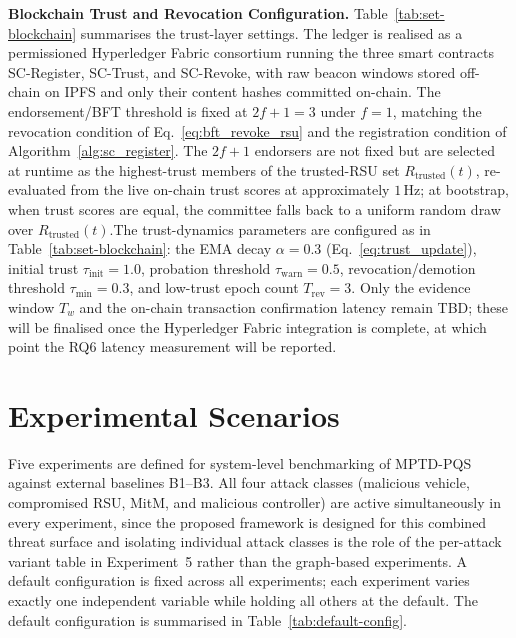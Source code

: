 \documentclass[12pt, a4paper]{report}
\begin{document}
\textbf{Blockchain Trust and Revocation Configuration.}
Table~\ref{tab:set-blockchain} summarises the trust-layer settings. The
ledger is realised as a permissioned Hyperledger Fabric consortium running
the three smart contracts SC-Register, SC-Trust, and SC-Revoke, with raw
beacon windows stored off-chain on IPFS and only their content hashes
committed on-chain. The endorsement/BFT threshold is fixed at $2f+1=3$
under $f=1$, matching the revocation condition of
Eq.~\eqref{eq:bft_revoke_rsu} and the registration condition of
Algorithm~\ref{alg:sc_register}. The $2f+1$ endorsers are not fixed but are selected at runtime as the
highest-trust members of the trusted-RSU set $R_{\text{trusted}}(t)$,
re-evaluated from the live on-chain trust scores at approximately
$1$\,Hz; at bootstrap, when trust scores are equal, the committee falls
back to a uniform random draw over $R_{\text{trusted}}(t)$.The trust-dynamics parameters are configured as in Table~\ref{tab:set-blockchain}: the EMA decay $\alpha=0.3$ (Eq.~\eqref{eq:trust_update}), initial trust $\tau_{\mathrm{init}}=1.0$, probation threshold $\tau_{\mathrm{warn}}=0.5$, revocation/demotion threshold $\tau_{\min}=0.3$, and low-trust epoch count $T_{\mathrm{rev}}=3$. Only the evidence window $T_w$ and the on-chain transaction confirmation latency remain TBD; these will be finalised once the Hyperledger Fabric integration is complete, at which point the RQ6 latency measurement will be reported.


\section{Experimental Scenarios}
\label{sec:scenarios}

Five experiments are defined for system-level benchmarking of
MPTD-PQS against external baselines B1--B3. All four attack
classes (malicious vehicle, compromised RSU, MitM, and malicious
controller) are active simultaneously in every experiment, since
the proposed framework is designed for this combined threat surface
and isolating individual attack classes is the role of the
per-attack variant table in Experiment~5 rather than the
graph-based experiments. A default configuration is fixed across
all experiments; each experiment varies exactly one independent
variable while holding all others at the default. The default
configuration is summarised in Table~\ref{tab:default-config}.
\end{document}
